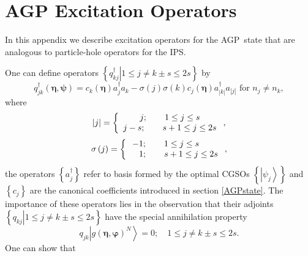 \documentclass[aps,preprint]{revtex4}%
\begin{document}
\section{AGP Excitation Operators\label{q_op}}

In this appendix we describe excitation operators for the AGP\ state that are
analogous to particle-hole operators for the IPS.

One can define operators $\left\{  \left.  q_{kj}^{\dagger}\right\vert 1\leq
j\neq k\pm s\leq2s\right\}  $ by
\begin{equation}
q_{jk}^{\dagger}\left(  \boldsymbol{\eta,\psi}\right)  =c_{k}\left(
\boldsymbol{\eta}\right)  a_{j}^{\dagger}a_{k}-\sigma\left(  j\right)
\sigma\left(  k\right)  c_{j}\left(  \boldsymbol{\eta}\right)  a_{\left\vert
k\right\vert }^{\dagger}a_{\left\vert j\right\vert }\text{ for }n_{j}\neq
n_{k},
\end{equation}
where%
\begin{equation}
\left\vert j\right\vert =\left\{
\begin{array}
[c]{c}%
j;\qquad1\leq j\leq s\\
j-s;\qquad s+1\leq j\leq2s
\end{array}
\right.  ,
\end{equation}%
\begin{equation}
\sigma\left(  j\right)  =\left\{
\begin{array}
[c]{c}%
-1;\qquad1\leq j\leq s\quad\quad\\
\quad1;\qquad s+1\leq j\leq2s
\end{array}
\right.  ,
\end{equation}
the operators $\left\{  a_{j}^{\dagger}\right\}  $ refer to basis formed by
the optimal CGSOs $\left\{  \left\vert \psi_{j}\right\rangle \right\}  $ and
$\left\{  c_{j}\right\}  $ are the canonical coefficients introduced in
section \ref{AGPstate}. The importance of these operators lies in the
observation that their adjoints $\left\{  \left.  q_{kj}\right\vert 1\leq
j\neq k\pm s\leq2s\right\}  $ have the special annihilation property%
\begin{equation}
q_{jk}\left\vert g\left(  \boldsymbol{\eta},\boldsymbol{\varphi}\right)
^{N}\right\rangle =0;\quad1\leq j\neq k\pm s\leq2s.
\end{equation}
One can show \cite{Goscinski82a} that
\end{document}
